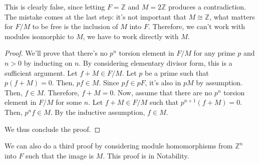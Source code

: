 \documentclass{article}
\theoremstyle{definition}
\newcommand{\Z}{\mathbb{Z}}
\begin{document}
This is clearly false, since letting $F = \Z$ and $M = 2\Z$ produces a contradiction.
The mistake comes at the last step: it's not important that $M \cong \Z$, what matters
for $F/M$ to be free is the inclusion of $M$ into $F$. Therefore, we can't work
with modules isomorphic to $M$, we have to work directly with $M$.

\begin{proof}
    We'll prove that there's no $p^{n}$ torsion element in $F/M$ for any prime $p$ and $n > 0$ by inducting
    on $n$. By considering elementary divisor form, this is a sufficient argument.
    Let $f + M \in F/M$. Let $p$ be a prime such that $p(f + M) = 0$. Then, $pf \in M$.
    Since $pf \in pF$, it's also in $pM$ by assumption. Then, $f \in M$. Therefore, $f + M = 0$.
    Now, assume that there are no $p^{n}$ torsion element in $F/M$ for some $n$.
    Let $f + M \in F/M$ such that $p^{n+1}(f + M) = 0$. Then, $p^{n}f \in M$. By the inductive
    assumption, $f \in M$.
    
    We thus conclude the proof.
\end{proof}

We can also do a third proof by considering module homomorphisms from $\Z^{n}$ into $F$
such that the image is $M$. This proof is in Notability.
\end{document}
